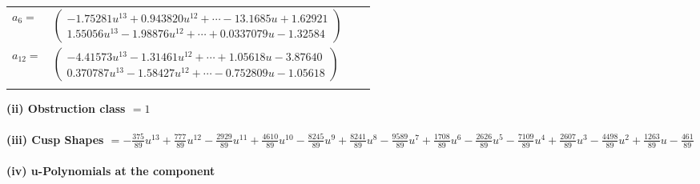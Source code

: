 \documentclass[1p]{elsarticle_modified}
\theoremstyle{definition}
\begin{document}
\begin{tabular}{m{7pt} m{180pt} m{7pt} m{180pt} }
\flushright $a_{6}=$&$\begin{pmatrix}-1.75281 u^{13}+0.943820 u^{12}+\cdots-13.1685 u+1.62921\\1.55056 u^{13}-1.98876 u^{12}+\cdots+0.0337079 u-1.32584\end{pmatrix}$ \\
\flushright $a_{12}=$&$\begin{pmatrix}-4.41573 u^{13}-1.31461 u^{12}+\cdots+1.05618 u-3.87640\\0.370787 u^{13}-1.58427 u^{12}+\cdots-0.752809 u-1.05618\end{pmatrix}$\\&\end{tabular}
\flushleft \textbf{(ii) Obstruction class $= 1$}\\~\\
\flushleft \textbf{(iii) Cusp Shapes $= -\frac{375}{89} u^{13}+\frac{777}{89} u^{12}-\frac{2929}{89} u^{11}+\frac{4610}{89} u^{10}-\frac{8245}{89} u^9+\frac{8241}{89} u^8-\frac{9589}{89} u^7+\frac{1708}{89} u^6-\frac{2626}{89} u^5-\frac{7109}{89} u^4+\frac{2607}{89} u^3-\frac{4498}{89} u^2+\frac{1263}{89} u-\frac{461}{89}$}\\~\\
\newpage\renewcommand{\arraystretch}{1}
\flushleft \textbf{(iv) u-Polynomials at the component}\newline \\
\end{document}
